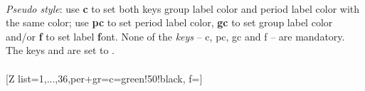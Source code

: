 \\ [0pt]\pgfPTendstyle%
\label{style_per+gr}%
%
{\textit{Pseudo style}: use \textbf{c} to set both keys group label color and period label color with the same color; use \textbf{pc} to set period label color, \textbf{gc} to set group label color and/or \textbf{f } to set label \textbf{f}ont. None of the \textit{keys} -- c, pc, gc and f -- are mandatory.
The keys  and  are set to .
\\ [3pt]%
}%
\\ [5pt][Z list={1,...,36},per+gr={c=green!50!black, f=\string{}\string\selectfont\string\normalsize\string\bfseries}]%
\\ [10pt]\makebox[\linewidth][c]{\scalebox{.6}{\pgfPT[Z list={1,...,36},per+gr={c=green!50!black,f=\fontfamily{frc}\selectfont\normalsize\bfseries}]}}%
\\ [0pt]\pgfPTendstyle%
\endinput
